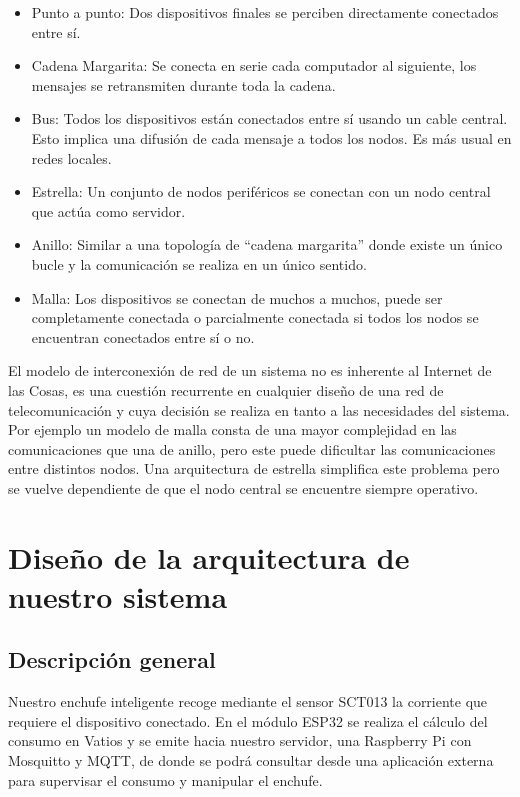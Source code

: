 \documentclass[a4paper,10pt]{article}
\begin{document}
\begin{itemize}
\item{Punto a punto: Dos dispositivos finales se perciben directamente
  conectados entre sí.}
\item{Cadena Margarita: Se conecta en serie cada computador al
  siguiente, los mensajes se retransmiten durante toda la cadena.}
\item{Bus: Todos los dispositivos están conectados entre sí usando
  un cable central. Esto implica una difusión de cada mensaje a
  todos los nodos. Es más usual en redes locales.}
\item{Estrella: Un conjunto de nodos periféricos se conectan con un
  nodo central que actúa como servidor.}
\item{Anillo: Similar a una topología de “cadena margarita” donde
  existe un único bucle y la comunicación se realiza en un único
  sentido.}
\item{Malla: Los dispositivos se conectan de muchos a muchos, puede
  ser completamente conectada o parcialmente conectada si todos los
  nodos se encuentran conectados entre sí o no.}
\end{itemize}

El modelo de interconexión de red de un sistema no es inherente al
Internet de las Cosas, es una cuestión recurrente en cualquier diseño
de una red de telecomunicación y cuya decisión se realiza en tanto a
las necesidades del sistema. Por ejemplo un modelo de malla consta de
una mayor complejidad en las comunicaciones que una de anillo, pero
este puede dificultar las comunicaciones entre distintos nodos. Una
arquitectura de estrella simplifica este problema pero se vuelve
dependiente de que el nodo central se encuentre siempre operativo.

\newpage

\section{Diseño de la arquitectura de nuestro
sistema}\label{diseuxf1o-de-la-arquitectura-de-nuestro-sistema}

\subsection{Descripción general}\label{descripciuxf3n-general}

Nuestro enchufe inteligente recoge mediante el sensor SCT013 la
corriente que requiere el dispositivo conectado. En el módulo ESP32 se
realiza el cálculo del consumo en Vatios y se emite hacia nuestro
servidor, una Raspberry Pi con Mosquitto y MQTT, de donde se podrá
consultar desde una aplicación externa para supervisar el consumo y
manipular el enchufe.
\end{document}
